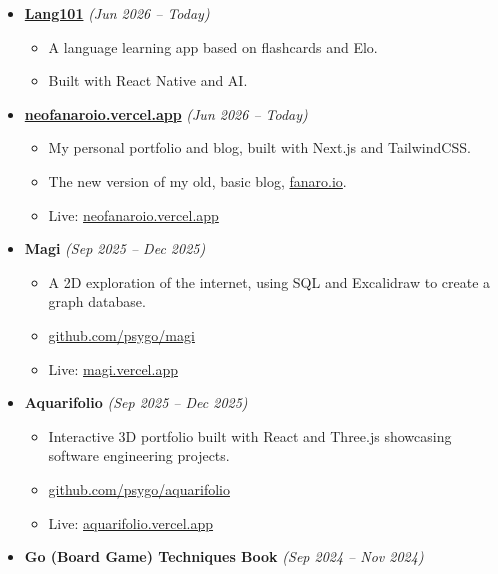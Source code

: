 \documentclass[14pt]{extarticle}
\renewcommand{\_}{\leavevmode\kern.06em\vbox{\hrule width.425em}}
\begin{document}
\begin{itemize}
  \item \textbf{\href{https://neofanaroio.vercel.app/articles/lang101}{Lang101}
} \textit{(Jun 2026 -- Today)}
    \begin{itemize}
      \item A language learning app based on flashcards and Elo.
      \item Built with React Native and AI.
    \end{itemize}

  \item \textbf{\href{https://neofanaroio.vercel.app}{neofanaroio.vercel.app}
} \textit{(Jun 2026 -- Today)}
    \begin{itemize}
      \item My personal portfolio and blog, built with Next.js and TailwindCSS.
      \item The new version of my old, basic blog, \href{https://github.com/psygo/fanaro.io}{fanaro.io}.
      \item Live: \href{https://neofanaroio.vercel.app}{neofanaroio.vercel.app}
    \end{itemize}
    
  \item \textbf{Magi} \textit{(Sep 2025 -- Dec 2025)} 
    \begin{itemize}
      \item A 2D exploration of the internet, using SQL and Excalidraw to create a graph database.
      \item \href{https://github.com/psygo/magi}{github.com/psygo/magi}
      \item Live: \href{https://magi-phi.vercel.app/}{magi.vercel.app}
    \end{itemize}
    
  \item \textbf{Aquarifolio} \textit{(Sep 2025 -- Dec 2025)}
    \begin{itemize}
      \item Interactive 3D portfolio built with React and Three.js showcasing software engineering projects.
      \item \href{https://github.com/psygo/aquarifolio}{github.com/psygo/aquarifolio}
      \item Live: \href{https://aquarifolio.vercel.app}{aquarifolio.vercel.app}
    \end{itemize}
    
  \item \textbf{Go (Board Game) Techniques Book} \textit{(Sep 2024 -- Nov 2024)}
    

\end{itemize}
\end{document}
